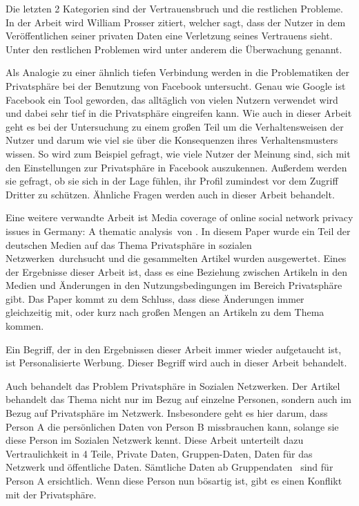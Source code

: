 Die letzten 2 Kategorien sind der Vertrauensbruch und die restlichen Probleme. In der Arbeit wird William Prosser zitiert, welcher sagt, dass der Nutzer in dem Veröffentlichen seiner privaten Daten eine Verletzung seines Vertrauens sieht. Unter den restlichen Problemen wird unter anderem die Überwachung genannt.

Als Analogie zu einer ähnlich tiefen Verbindung werden in \citet{debatin2009facebook} die Problematiken der Privatsphäre bei der Benutzung von Facebook untersucht. Genau wie Google ist Facebook ein Tool geworden, das alltäglich von vielen Nutzern verwendet wird und dabei sehr tief in die Privatsphäre eingreifen kann. Wie auch in dieser Arbeit geht es bei der Untersuchung zu einem großen Teil um die Verhaltensweisen der Nutzer und darum wie viel sie über die Konsequenzen ihres Verhaltensmusters wissen. So wird zum Beispiel gefragt, wie viele Nutzer der Meinung sind, sich mit den Einstellungen zur Privatsphäre in Facebook auszukennen. Außerdem werden sie gefragt, ob sie sich in der Lage fühlen, ihr Profil zumindest vor dem Zugriff Dritter zu schützen. Ähnliche Fragen werden auch in dieser Arbeit behandelt.

Eine weitere verwandte Arbeit ist \glqq Media coverage of online social network privacy issues in Germany: A thematic analysis\grqq\ von \citet{rizk2009media}. In diesem Paper wurde ein Teil der deutschen Medien auf das Thema \glqq Privatsphäre in sozialen Netzwerken\grqq\ durchsucht und die gesammelten Artikel wurden ausgewertet. Eines der Ergebnisse dieser Arbeit ist, dass es eine Beziehung zwischen Artikeln in den Medien und Änderungen in den Nutzungsbedingungen im Bereich Privatsphäre gibt. Das Paper kommt zu dem Schluss, dass diese Änderungen immer gleichzeitig mit, oder kurz nach großen Mengen an Artikeln zu dem Thema kommen.

Ein Begriff, der in den Ergebnissen dieser Arbeit immer wieder aufgetaucht ist, ist \glqq Personalisierte Werbung\grqq . Dieser Begriff wird auch in dieser Arbeit behandelt.

Auch \citet{Preibusch2007Ubiquitous} behandelt das Problem Privatsphäre in Sozialen Netzwerken. Der Artikel behandelt das Thema nicht nur im Bezug auf einzelne Personen, sondern auch im Bezug auf Privatsphäre im Netzwerk. Insbesondere geht es hier darum, dass Person A die persönlichen Daten von Person B missbrauchen kann, solange sie diese Person im Sozialen Netzwerk kennt. Diese Arbeit unterteilt dazu Vertraulichkeit in 4 Teile, Private Daten, Gruppen-Daten, Daten für das Netzwerk und öffentliche Daten. Sämtliche Daten ab \glqq Gruppendaten \grqq\ sind für Person A ersichtlich. Wenn diese Person nun bösartig ist, gibt es einen Konflikt mit der Privatsphäre. 

